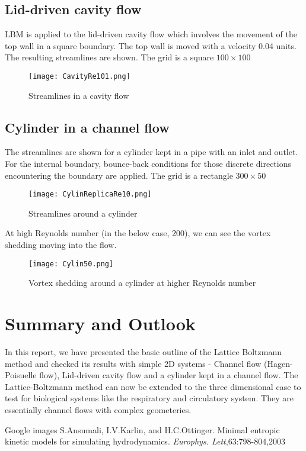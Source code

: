 \documentclass[titlepage,a4paper,10pt]{article}
\begin{document}
\subsection{Lid-driven cavity flow}
LBM is applied to the lid-driven cavity flow which involves the movement of the top wall in a square boundary.
The top wall is moved with a velocity 0.04 units. The resulting streamlines are shown. The grid is a square $100\times100$
\begin{figure}[H]
\centering
\texttt{[image: CavityRe101.png]}
\caption{Streamlines in a cavity flow}
\label{overflow}
\end{figure}

\subsection{Cylinder in a channel flow}
The streamlines are shown for a cylinder kept in a pipe with an inlet and outlet. For the internal boundary, bounce-back conditions for those discrete directions encountering the boundary are applied. The grid is a rectangle $300\times50$
\begin{figure}[H]
\centering
\texttt{[image: CylinReplicaRe10.png]}
\caption{Streamlines around a cylinder}
\label{overflow}
\end{figure}
At high Reynolds number (in the below case, 200), we can see the vortex shedding moving into the flow.
\begin{figure}[H]
\centering
\texttt{[image: Cylin50.png]}
\caption{Vortex shedding around a cylinder at higher Reynolds number}
\label{overflow}
\end{figure}

\section{Summary and Outlook}
In this report, we have presented the basic outline of the Lattice Boltzmann method and checked its results with simple 2D systems - Channel flow (Hagen-Poisuelle flow), Lid-driven cavity flow and a cylinder kept in a channel flow. The Lattice-Boltzmann method can now be extended to the three dimensional case to test for biological systems like the respiratory and circulatory system. They are essentially channel flows with complex geometeries.

\begin{thebibliography}{10}
 Google images
 S.Ansumali, I.V.Karlin, and H.C.Ottinger. Minimal entropic kinetic models for simulating hydrodynamics. \textit{Europhys. Lett},63:798-804,2003
\end{thebibliography}
\end{document}
